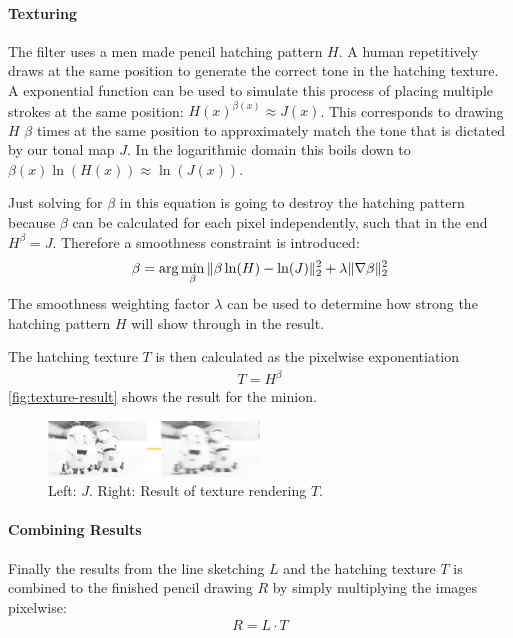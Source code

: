 \paragraph{Texturing}
The filter uses a men made pencil hatching pattern $H$. A human repetitively draws
at the same position to generate the correct tone in the hatching texture. A
exponential function can be used to simulate this process of placing multiple
strokes at the same position: $H(x)^{\beta(x)} \approx J(x)$. This corresponds
to drawing $H$ $\beta$ times at the same position to approximately match
the tone that is dictated by our tonal map $J$. In the logarithmic domain this
boils down to $\beta(x) \ln\left( H(x) \right) \approx \ln\left( J(x)
\right)$.

Just solving for $\beta$ in this equation is going to destroy the hatching
pattern because $\beta$ can be calculated for each pixel independently, such
that in the end $H^{\beta} = J$. Therefore a smoothness constraint is
introduced:
\begin{align}
  \beta = \arg \min_{\beta}\|\beta\ln(H) - \ln(J)\|_2^2 + \lambda
  \|\nabla \beta\|_2^2
  \label{eq:beta}
\end{align}
The smoothness weighting factor $\lambda$ can be used to determine how strong
the hatching pattern $H$ will show through in the result.

The hatching texture $T$ is then calculated as the pixelwise exponentiation
\begin{align*}
  T = H^{\beta}
\end{align*}
\autoref{fig:texture-result} shows the result for the minion.

\begin{figure}[htb]
  \centering
  \includegraphics[width=0.5\textwidth]{images/texture-result.png}
  \caption{Left: $J$. Right: Result of texture rendering $T$.}
  \label{fig:texture-result}
\end{figure}



\paragraph{Combining Results}
Finally the results from the line sketching $L$ and the hatching texture $T$ is
combined to the finished pencil drawing $R$ by simply multiplying the images
pixelwise:
\begin{align*}
  R = L  \cdot T
\end{align*}

